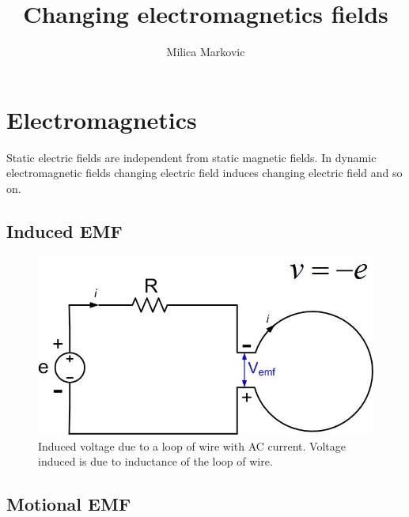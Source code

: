 \documentclass{ximera}
\title{Changing electromagnetics fields}
\author{Milica Markovic}
\begin{document}
  
\begin{abstract}  

\end{abstract}  
\maketitle    


\section{Electromagnetics}

 Static electric fields are independent from static magnetic fields. In dynamic electromagnetic fields changing electric field induces changing electric field and so on. 



\subsection{Induced EMF}




\begin{figure}[htbp]
\begin{center}
\includegraphics[scale=0.5]{../jpg/inducedvoltage.jpg}
\end{center}
\caption{Induced voltage due to a loop of wire with AC current. Voltage induced is due to inductance of the loop of wire.}
\label{inducedemf}
\end{figure}






\subsection{Motional EMF}
\end{document}
